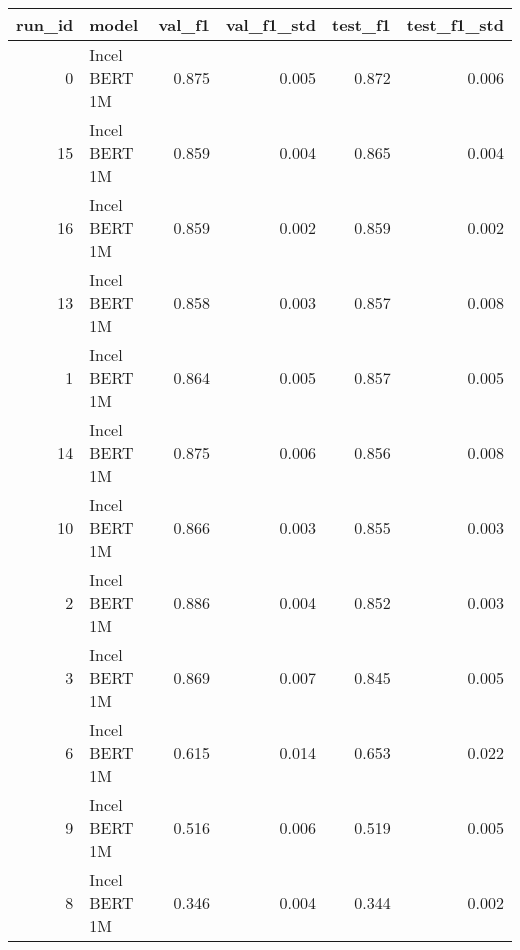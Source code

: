 \begin{tabular}{rlrrrr}
\toprule
 run\_id &         model &  val\_f1 &  val\_f1\_std &  test\_f1 &  test\_f1\_std \\
\midrule
      0 & Incel BERT 1M &   0.875 &       0.005 &    0.872 &        0.006 \\
     15 & Incel BERT 1M &   0.859 &       0.004 &    0.865 &        0.004 \\
     16 & Incel BERT 1M &   0.859 &       0.002 &    0.859 &        0.002 \\
     13 & Incel BERT 1M &   0.858 &       0.003 &    0.857 &        0.008 \\
      1 & Incel BERT 1M &   0.864 &       0.005 &    0.857 &        0.005 \\
     14 & Incel BERT 1M &   0.875 &       0.006 &    0.856 &        0.008 \\
     10 & Incel BERT 1M &   0.866 &       0.003 &    0.855 &        0.003 \\
      2 & Incel BERT 1M &   0.886 &       0.004 &    0.852 &        0.003 \\
      3 & Incel BERT 1M &   0.869 &       0.007 &    0.845 &        0.005 \\
      6 & Incel BERT 1M &   0.615 &       0.014 &    0.653 &        0.022 \\
      9 & Incel BERT 1M &   0.516 &       0.006 &    0.519 &        0.005 \\
      8 & Incel BERT 1M &   0.346 &       0.004 &    0.344 &        0.002 \\
\bottomrule
\end{tabular}

